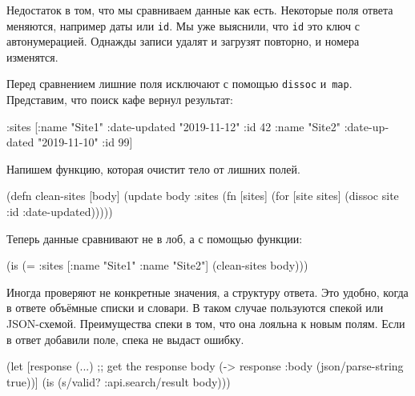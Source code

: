Недостаток в том, что мы сравниваем данные как есть. Некоторые поля ответа
меняются, например даты или \verb|id|. Мы уже выяснили, что \verb|id| это
ключ с автонумерацией. Однажды записи удалят и загрузят повторно, и номера
изменятся.

Перед сравнением лишние поля исключают с помощью \verb|dissoc|
и~\verb|map|. Представим, что поиск кафе вернул результат:

\begin{english}
  \begin{clojure}
{:sites [{:name "Site1" :date-updated "2019-11-12" :id 42}
         {:name "Site2" :date-updated "2019-11-10" :id 99}]}
  \end{clojure}
\end{english}


\noindent
Напишем функцию, которая очистит тело от лишних полей.

\begin{english}
  \begin{clojure}
(defn clean-sites [body]
  (update body :sites
          (fn [sites]
            (for [site sites]
              (dissoc site :id :date-updated)))))
  \end{clojure}
\end{english}

\noindent
Теперь данные сравнивают не в лоб, а с помощью функции:

\begin{english}
  \begin{clojure}
(is (= {:sites [{:name "Site1"} {:name "Site2"}]}
       (clean-sites body)))
  \end{clojure}
\end{english}

Иногда проверяют не конкретные значения, а структуру ответа. Это удобно, когда в
ответе объёмные списки и словари. В таком случае пользуются спекой или
JSON-схемой. Преимущества спеки в том, что она лояльна к новым полям. Если в
ответ добавили поле, спека не выдаст ошибку.


\begin{english}
  \begin{clojure}
(let [response (...) ;; get the response
      body (-> response :body (json/parse-string true))]
  (is (s/valid? :api.search/result body)))
  \end{clojure}
\end{english}

